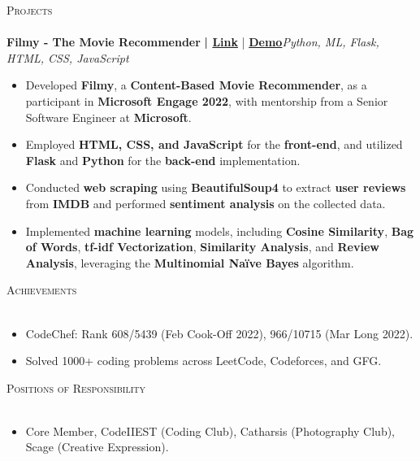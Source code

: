 \documentclass[a4paper]{article}
\newcommand{\lineunder} {
    \vspace*{-8pt} \\
    \hspace*{-18pt} \hrulefill \\
}
\newcommand{\header} [1] {
    {\hspace*{-18pt}\vspace*{6pt} \textsc{#1}}
    \vspace*{-6pt} \lineunder
}
\begin{document}
\header{Projects}
\vspace*{1mm}
\textbf{Filmy - The Movie Recommender} \textbf{| \href{https://github.com/Gourav1695/Filmy-The_Movie_Recommender}{Link}} | \href{https://www.youtube.com/watch?v=dgjVmIz1c1c}{\textbf{Demo}}\hfill{\sl Python, ML, Flask, HTML, CSS, JavaScript}\\
\begin{itemize} \itemsep -2pt
\item Developed \textbf{Filmy}, a \textbf{Content-Based Movie Recommender}, as a participant in \textbf{Microsoft Engage 2022}, with mentorship from a Senior Software Engineer at \textbf{Microsoft}.
\item Employed \textbf{HTML, CSS, and JavaScript} for the \textbf{front-end}, and utilized \textbf{Flask} and \textbf{Python} for the \textbf{back-end} implementation.
\item Conducted \textbf{web scraping} using \textbf{BeautifulSoup4} to extract \textbf{user reviews} from \textbf{IMDB} and performed \textbf{sentiment analysis} on the collected data.
\item Implemented \textbf{machine learning} models, including \textbf{Cosine Similarity}, \textbf{Bag of Words}, \textbf{tf-idf Vectorization}, \textbf{Similarity Analysis}, and \textbf{Review Analysis}, leveraging the \textbf{Multinomial Naïve Bayes} algorithm.
\end{itemize}

\header{Achievements}
\vspace{-2mm}
\begin{itemize} \itemsep -2pt
    \item CodeChef: Rank 608/5439 (Feb Cook-Off 2022), 966/10715 (Mar Long 2022).
    \item Solved 1000+ coding problems across LeetCode, Codeforces, and GFG.
\end{itemize}

\vspace{-4mm}
\header{Positions of Responsibility}
\vspace{-1mm}
\begin{itemize} \itemsep -2pt
    \item Core Member, CodeIIEST (Coding Club), Catharsis (Photography Club), Scage (Creative Expression).
\end{itemize}
\end{document}
